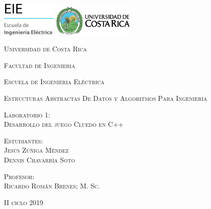 \begin{titlepage}
		\bf
		\centering
		\includegraphics[width=0.20\textwidth]{images/EIE.png}			
		\hspace{7cm} 
		\includegraphics[width=0.30\textwidth]{images/UCR.png}	
		\par
		\vspace{2cm}			
		{\scshape\large Universidad de Costa Rica \par}
		\vspace{0.6cm}
		{\scshape\large Facultad de Ingenieria\par}
		\vspace{0.6cm}
		{\scshape\large Escuela de Ingenieria Eléctrica\par}
		\vspace{0.6cm}
		{\scshape\large Estructuras Abstractas De Datos y Algoritmos Para Ingeniería   \par}
		\vspace{1.5cm}		
		{\scshape\large Laboratorio 1:\\ Desarrollo del juego Cluedo en C++ \par}
		\vspace{2.5cm}		
		{\scshape\large Estudiantes:\\ Jesús Zúñiga Méndez \\ Dennis Chavarría Soto  \par}
		\vspace{2.5cm}		
		{\scshape\large Profesor:\\ Ricardo Román Brenes; M. Sc. \par}
		\vspace{2.5cm}
		{\scshape\large II ciclo 2019 \par}
\end{titlepage}
